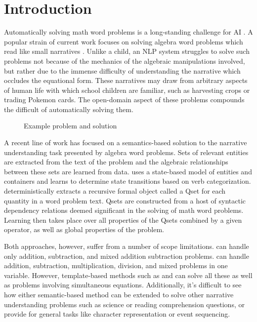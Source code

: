 \section{Introduction}
Automatically solving math word problems is a long-standing challenge for AI \cite{bobrow1964natural,charniak1969computer,seo2015solving,shi2015automatically}.
A popular strain of current work focuses on solving algebra word problems which read like small narratives \cite{Roy15,roy2015solving,hosseini2014learning,kushman2014learning,koncel2015parsing,zhou2015learn}.
Unlike a child, an NLP system struggles to solve such problems not because of the mechanics of the algebraic manipulations involved, but rather due to the immense difficulty of understanding the narrative which occludes the equational form. 
These narratives may draw from arbitrary aspects of human life with which school children are familiar, such as harvesting crops or trading Pokemon cards. The open-domain aspect of these problems compounds the difficult of automatically solving them.

\begin{figure}[tb]

\caption{Example problem and solution}
\label{fig:teaser}
\end{figure}

A recent line of work has focused on a semantics-based solution to the narrative understanding task presented by algebra word problems. Sets of relevant entities are extracted from the text of the problem and the algebraic relationships between these sets are learned from data. 
 uses a state-based model of entities and containers and learns to determine state transitions based on verb categorization. 
 deterministically extracts a recursive formal object called a Qset for each quantity in a word problem text. 
Qsets are constructed from a host of syntactic dependency relations deemed significant in the solving of math word problems. 
Learning then takes place over all properties of the Qsets combined by a given operator, as well as global properties of the problem.

Both approaches, however, suffer from a number of scope limitations. 
 can handle only addition, subtraction, and mixed addition subtraction problems. 
 can handle addition, subtraction, multiplication, division, and mixed problems in one variable. 
However, template-based methods such as  and  can solve all these as well as problems involving simultaneous equations. Additionally, it's difficult to see how either semantic-based method can be extended to solve other narrative understanding problems such as science or reading comprehension questions, or provide for general tasks like character representation or event sequencing.

